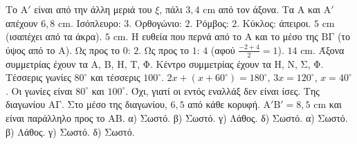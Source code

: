  Το $\mathrm{Α}'$ είναι από την άλλη μεριά του $\xi$, πάλι $3{,}4$ cm από τον άξονα. Τα $\mathrm{Α}$ και $\mathrm{Α}'$ απέχουν $6{,}8$ cm.
 Ισόπλευρο: $3$. Ορθογώνιο: $2$. Ρόμβος: $2$. Κύκλος: άπειροι.
 $5$ cm (ισαπέχει από τα άκρα).
 $5$ cm.
 Η ευθεία που περνά από το $\mathrm{Α}$ και το μέσο της $\mathrm{ΒΓ}$ (το ύψος από το $\mathrm{Α}$).
 Ως προς το $0$: $2$. Ως προς το $1$: $4$ (αφού $\frac{-2+4}{2}=1$).
 $14$ cm.
 Άξονα συμμετρίας έχουν τα Α, Β, Η, Τ, Φ. Κέντρο συμμετρίας έχουν τα Η, Ν, Σ, Φ.
 Τέσσερις γωνίες $80^\circ$ και τέσσερις $100^\circ$.
 $2x+(x+60^\circ)=180^\circ$, $3x=120^\circ$, $x=40^\circ$. Οι γωνίες είναι $80^\circ$ και $100^\circ$.
 Όχι, γιατί οι εντός εναλλάξ δεν είναι ίσες.
 Της διαγωνίου $\mathrm{ΑΓ}$.
 Στο μέσο της διαγωνίου, $6{,}5$ από κάθε κορυφή.
 $\mathrm{Α}'\mathrm{Β}'=8{,}5$ cm και είναι παράλληλο προς το $\mathrm{ΑΒ}$.
 α) Σωστό. β) Σωστό. γ) Λάθος. δ) Σωστό.
 α) Σωστό. β) Λάθος. γ) Σωστό. δ) Σωστό.
